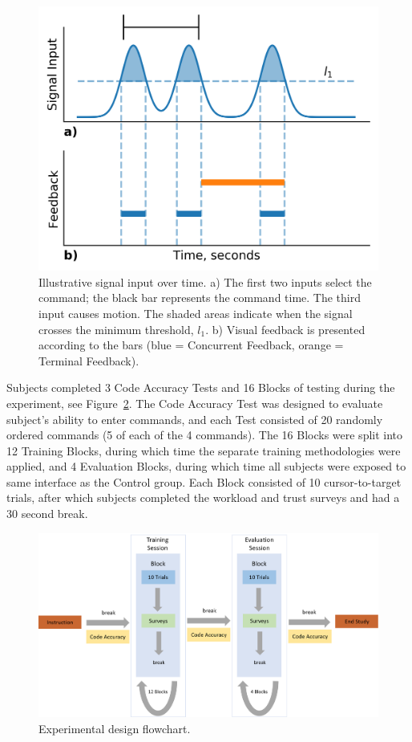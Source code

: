 \begin{figure}[bt!]
	\centering
	\includegraphics[height=.4\textwidth]{figures/EMG/Figure1}
	\caption[Illustrative signal input over time]{Illustrative signal input over time.
		a) The first two inputs select the command; the black bar represents the command time.
		The third input causes motion.
		The shaded areas indicate when the signal crosses the minimum threshold, $l_1$.
		b) Visual feedback is presented according to the bars (blue = Concurrent Feedback, orange = Terminal Feedback).}
	\label{figure:label1}
\end{figure}

Subjects completed 3 Code Accuracy Tests and 16 Blocks of testing during the experiment, see Figure~\ref{emg:experimentaldesign}.
The Code Accuracy Test was designed to evaluate subject's ability to enter commands, and each Test consisted of 20 randomly ordered commands (5 of each of the 4 commands).
The 16 Blocks were split into 12 Training Blocks, during which time the separate training methodologies were applied, and 4 Evaluation Blocks, during which time all subjects were exposed to same interface as the Control group.
Each Block consisted of 10 cursor-to-target trials, after which subjects completed the workload and trust surveys and had a 30 second break.

\begin{figure}[bt!]
	\centering
	\includegraphics[width=\linewidth]{figures/EMG/Figure3}
	\caption[Experimental design flowchart]{Experimental design flowchart.}
	\label{emg:experimentaldesign}
\end{figure}

